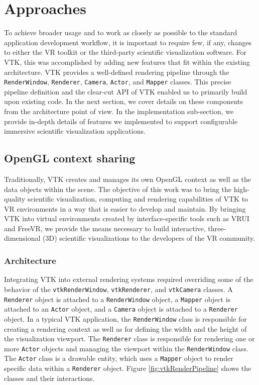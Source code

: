 \section{Approaches}

To achieve broader usage and to work as closely as possible to the standard application development workflow, it is important to require few, if any, changes to either the VR toolkit or the third-party scientific visualization software.
For VTK, this was accomplished by adding new features that fit within the existing architecture. 
VTK provides a well-defined rendering pipeline through the \texttt{RenderWindow}, \texttt{Renderer}, \texttt{Camera}, \texttt{Actor}, and \texttt{Mapper} classes.
This precise pipeline definition and the clear-cut API of VTK enabled us to primarily build upon
existing code.
In the next section, we cover details on these components from the architecture point of view.
In the implementation sub-section, we provide in-depth details of features we implemented to support configurable immersive scientific visualization applications. 

\subsection{OpenGL context sharing}

Traditionally, VTK creates and manages its own OpenGL context as well as the data objects within the scene.
The objective of this work was to bring the high-quality scientific visualization, computing and rendering capabilities of VTK to VR environments in a way that is easier to develop and maintain.
By bringing VTK into virtual environments created by interface-specific tools such as VRUI and FreeVR, we provide the means necessary to build interactive, three-dimensional (3D) scientific visualizations to the developers of the VR community.

\subsubsection{Architecture}

Integrating VTK into external rendering systems required overriding some of the behavior of the \texttt{vtkRenderWindow}, \texttt{vtkRenderer}, and \texttt{vtkCamera} classes.
A \texttt{Renderer} object is attached to a \texttt{RenderWindow} object, a \texttt{Mapper} object is attached to an \texttt{Actor} object, and a \texttt{Camera} object is attached to a \texttt{Renderer} object.
In a typical VTK application, the \texttt{RenderWindow} class is responsible for creating a rendering context as well as for defining the width and the height of the visualization viewport.
The \texttt{Renderer} class is responsible for rendering one or more
\texttt{Actor} objects and managing the viewport within the \texttt{RenderWindow} class.
The \texttt{Actor} class is a drawable entity, which uses a \texttt{Mapper} object to render specific data within a \texttt{Renderer} object.
Figure \ref{fig:vtkRenderPipeline} shows the classes and their interactions.

